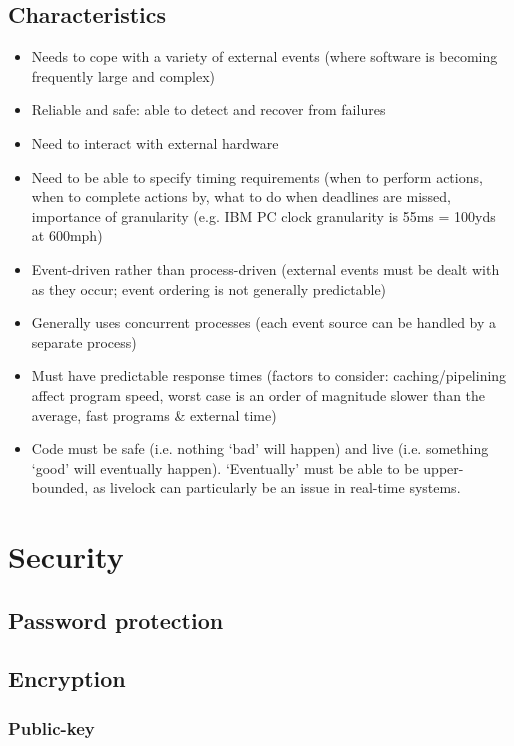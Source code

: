 \documentclass[a4paper,oneside]{report}
\begin{document}
  	\section{Characteristics}
  	
  	\begin{itemize}
  		\item Needs to cope with a variety of external events (where software is becoming frequently large and complex)
		\item Reliable and safe: able to detect and recover from failures
		\item Need to interact with external hardware
  		\item Need to be able to specify timing requirements (when to perform actions, when to complete actions by, what to do when deadlines are missed, importance of granularity (e.g. IBM PC clock granularity is 55ms = 100yds at 600mph)
  		\item Event-driven rather than process-driven (external events must be dealt with as they occur; event ordering is not generally predictable)
		\item Generally uses concurrent processes (each event source can be handled by a separate process)  
  		\item Must have predictable response times (factors to consider: caching/pipelining affect program speed, worst case is an order of magnitude slower than the average, fast programs \& external time)
  		\item Code must be safe (i.e. nothing `bad' will happen) and live (i.e. something `good' will eventually happen). `Eventually' must be able to be upper-bounded, as livelock can particularly be an issue in real-time systems.
  	\end{itemize}
  	
\chapter{Security}
  	\section{Password protection}
	\section{Encryption}
    	\subsection{Public-key}
\end{document}
